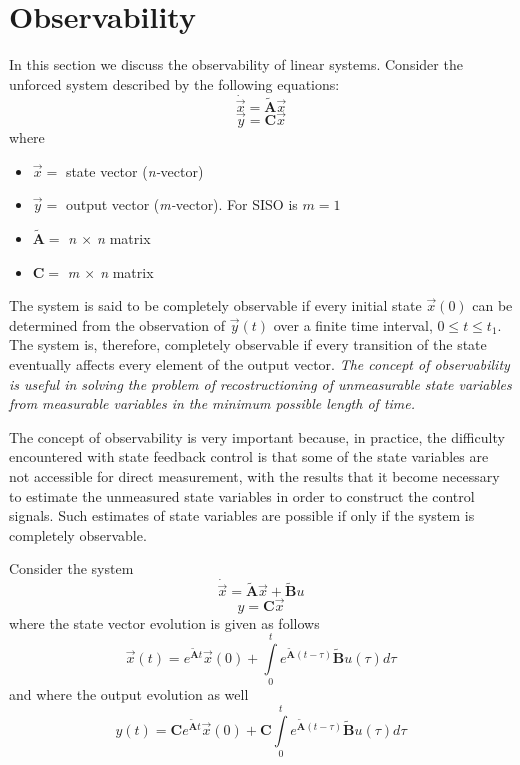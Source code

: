 \documentclass[11pt,a4paper,oneside]{book}
\numberwithin{equation}{section}
\theoremstyle{it}
\theoremstyle{definition}
\begin{document}
 
\section{Observability}
In this section we discuss the observability of linear systems. Consider the 
unforced system described by the following equations:
\begin{equation}\label{state_observer_eq_1}
	\dot{\vec x} = \tilde{\mathbf{A}} \vec x 
\end{equation}
\begin{equation}\label{state_observer_eq_2}
	\vec y = \mathbf{C} \vec x 
\end{equation}
where	\begin{itemize} 
	\item $\vec x = $ state vector (\textit{n-}vector)
	\item $\vec y = $ output vector (\textit{m-}vector). For SISO is $m=1$
	\item $ \tilde{\mathbf{A}} = $ \textit{n $\times$ n} matrix
	\item $ \mathbf{C} = $ \textit{m $\times$ n} matrix
\end{itemize}
The system is said to be completely observable if every initial state $\vec 
x(0)$ can be determined from the observation of $\vec y(t)$ over a finite time 
interval, $0 \leq t \leq t_1$. The system is, therefore, completely observable 
if every transition of the state eventually affects every element of the output 
vector. \textit{The concept of observability is useful in solving the problem 
of recostructioning of unmeasurable state variables from measurable variables 
in the minimum possible length of time.} 

The concept of observability is very important because, in practice, the 
difficulty encountered with state feedback control is that some of the state 
variables are not accessible for direct measurement, with the results that it 
become necessary to estimate the unmeasured state variables in order to 
construct the control signals. Such estimates of state variables are possible 
if only if the system is completely observable.

Consider the system
\begin{equation}
	\dot{\vec x} = \tilde{\mathbf{A}} \vec{x} + \tilde{\mathbf{B}} u
\end{equation}
\begin{equation}
y = \mathbf{C} \vec{x}
\end{equation}
where the state vector evolution is given as follows
\begin{equation}
	\vec x(t) = e^{\tilde{\mathbf{A}}t} \vec{x}(0) + \int\limits_0^t 
	e^{\tilde{\mathbf{A}}(t-\tau)}\tilde{\mathbf{B}} u(\tau)d\tau
\end{equation}
and where the output evolution as well
\begin{equation}
	y(t) = \mathbf{C}e^{\tilde{\mathbf{A}}t} \vec x(0) + 
	\mathbf{C}\int\limits_0^t 
	e^{\tilde{\mathbf{A}}(t-\tau)}\tilde{\mathbf{B}} u(\tau)d\tau
\end{equation}
\end{document}
